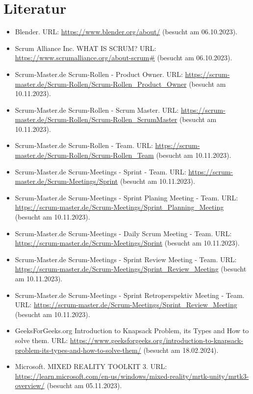 \chapter{Literatur}

\begin{itemize}
    \item Blender. URL: \url{https://www.blender.org/about/} (besucht am 06.10.2023).
    \item Scrum Alliance Inc. WHAT IS SCRUM? URL: \url{https://www.scrumalliance.org/about-scrum#} (besucht am 06.10.2023).
    \item Scrum-Master.de Scrum-Rollen - Product Owner. URL: \url{https://scrum-master.de/Scrum-Rollen/Scrum-Rollen_Product_Owner} (besucht am 10.11.2023).
    \item Scrum-Master.de Scrum-Rollen - Scrum Master. URL: \url{https://scrum-master.de/Scrum-Rollen/Scrum-Rollen_ScrumMaster} (besucht am 10.11.2023).
    \item Scrum-Master.de Scrum-Rollen - Team. URL: \url{https://scrum-master.de/Scrum-Rollen/Scrum-Rollen_Team} (besucht am 10.11.2023).
    \item Scrum-Master.de Scrum-Meetings - Sprint - Team. URL: \url{https://scrum-master.de/Scrum-Meetings/Sprint} (besucht am 10.11.2023).
    \item Scrum-Master.de Scrum-Meetings - Sprint Planing Meeting - Team. URL: \url{https://scrum-master.de/Scrum-Meetings/Sprint_Planning_Meeting} (besucht am 10.11.2023).
    \item Scrum-Master.de Scrum-Meetings - Daily Scrum Meeting - Team. URL: \url{https://scrum-master.de/Scrum-Meetings/Sprint} (besucht am 10.11.2023).
    \item Scrum-Master.de Scrum-Meetings - Sprint Review Meeting - Team. URL: \url{https://scrum-master.de/Scrum-Meetings/Sprint_Review_Meeting} (besucht am 10.11.2023).
    \item Scrum-Master.de Scrum-Meetings - Sprint Retroperspektiv Meeting - Team. URL: \url{https://scrum-master.de/Scrum-Meetings/Sprint_Review_Meeting} (besucht am 10.11.2023).
    \item GeeksForGeeks.org Introduction to Knapsack Problem, its Types and How to solve them. URL: \url{https://www.geeksforgeeks.org/introduction-to-knapsack-problem-its-types-and-how-to-solve-them/} (besucht am 18.02.2024).
    \item Microsoft. MIXED REALITY TOOLKIT 3. URL: \url{https://learn.microsoft.com/en-us/windows/mixed-reality/mrtk-unity/mrtk3-overview/} (besucht am 05.11.2023).

\end{itemize}
